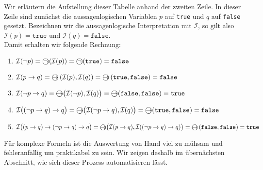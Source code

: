 Wir erl\"{a}utern die Aufstellung dieser Tabelle anhand der zweiten Zeile.  In dieser Zeile sind zun\"{a}chst die
aussagenlogischen Variablen $p$ auf \texttt{true} und $q$ auf \texttt{false} gesetzt.  Bezeichnen wir die
aussagenlogische Interpretation mit $\mathcal{I}$, so gilt also\\[0.2cm]
\hspace*{1.3cm} $\mathcal{I}(p) = \texttt{true}$ und $\mathcal{I}(q) = \texttt{false}$. \\[0.2cm]
Damit erhalten wir folgende Rechnung:
\begin{enumerate}
\item $\mathcal{I}(\neg p) = \circneg\,(\mathcal{I}(p)) = \circneg\,( \texttt{true}) = \texttt{false}$
\item $\mathcal{I}(p \rightarrow q) = \circright\,(\mathcal{I}(p), \mathcal{I}(q)) = \circright\,(\texttt{true}, \texttt{false}) = \texttt{false}$
\item $\mathcal{I}(\neg p \rightarrow q) = \circright\bigl( \mathcal{I}(\neg p), \mathcal{I}(q)\bigr) = \circright(\texttt{false}, \texttt{false}) = \texttt{true}$
\item $\mathcal{I}\bigl((\neg p \rightarrow q) \rightarrow q\bigr) = 
          \circright\bigl( \mathcal{I}(\neg p \rightarrow q), \mathcal{I}(q) \bigr) = 
          \circright( \texttt{true}, \texttt{false} ) = \texttt{false}$
\item $\mathcal{I}\bigl((p \rightarrow q) \rightarrow  (\neg p \rightarrow q) \rightarrow q\bigr) = 
      \circright\bigl( \mathcal{I}(p \rightarrow q),  \mathcal{I}((\neg p \rightarrow q) \rightarrow q)\bigr) = 
       \circright\,( \texttt{false},  \texttt{false} ) = \texttt{true}$
\end{enumerate}
F\"{u}r komplexe Formeln ist die Auswertung von Hand viel zu m\"{u}hsam und
fehleranf\"{a}llig um praktikabel zu sein.  Wir zeigen deshalb im \"{u}bern\"{a}chsten Abschnitt, wie
sich dieser Prozess automatisieren l\"{a}sst.

